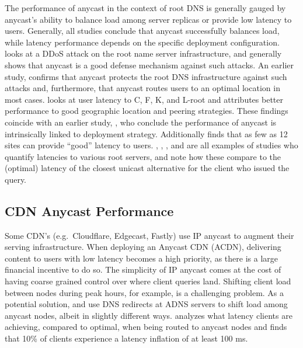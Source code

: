 \documentclass[sigconf,nonacm,10pt]{acmart}
\begin{document}
The performance of anycast in the context of root DNS is generally
gauged by anycast's ability to balance load among server replicas or
provide low latency to users. Generally, all studies conclude that
anycast successfully balances load, while latency performance depends on
the specific deployment configuration. \cite{moura2016anycast} looks at
a DDoS attack on the root name server infrastructure, and generally
shows that anycast is a good defense mechanism against such attacks. An
earlier study, \cite{sarat2006use} confirms that anycast protects the
root DNS infrastructure against such attacks and, furthermore, that
anycast routes users to an optimal location in most cases.
\cite{de2017anycast} looks at user latency to C, F, K, and L-root and
attributes better performance to good geographic location and peering
strategies. These findings coincide with an earlier study,
\cite{ballani2006measurement}, who conclude the performance of anycast
is intrinsically linked to deployment strategy. Additionally
\cite{de2017anycast} finds that as few as 12 sites can provide ``good''
latency to users. \cite{li_levin_spring_bhattacharjee_2018},
\cite{colitti2006evaluating}, \cite{de2017anycast}, and
\cite{liang2013measuring} are all examples of studies who quantify
latencies to various root servers, and note how these compare to the
(optimal) latency of the closest unicast alternative for the client who
issued the query.

\subsection{CDN Anycast Performance}\label{cdn-anycast-performance}

Some CDN's (e.g.~Cloudflare, Edgecast, Fastly) use IP anycast to augment
their serving infrastructure. When deploying an Anycast CDN (ACDN),
delivering content to users with low latency becomes a high priority, as
there is a large financial incentive to do so. The simplicity of IP
anycast comes at the cost of having coarse grained control over where
client queries land. Shifting client load between nodes during peak
hours, for example, is a challenging problem. As a potential solution,
\cite{flavel2015fastroute} and \cite{alzoubi2011practical} use DNS
redirects at ADNS servers to shift load among anycast nodes, albeit in
slightly different ways. \cite{calder2015analyzing} analyzes what
latency clients are achieving, compared to optimal, when being routed to
anycast nodes and finds that 10\% of clients experience a latency
inflation of at least 100 ms.
\end{document}

